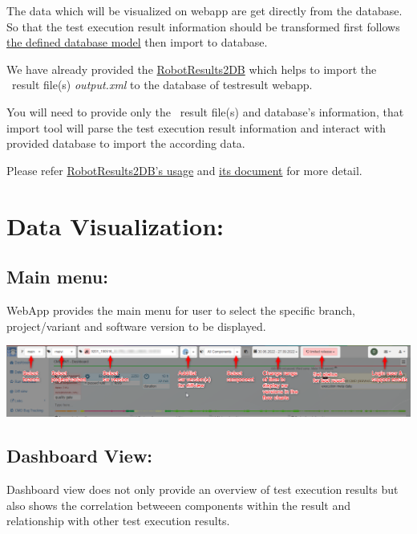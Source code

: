 The data which will be visualized on webapp are get directly from the database.
So that the test execution result information should be transformed first 
follows \href{https://github.com/test-fullautomation/testresultwebapp/blob/
develop/TestResultWebApp/mysql_server/datamodel/datamodel.svg}
{the defined database model} then import to database.

We have already provided the \href{https://github.com/test-fullautomation/
robotframework-testresultwebapptool}{RobotResults2DB} which helps to import the
\rfwcore\ result file(s) \emph{output.xml} to the database of testresult webapp.

You will need to provide only the \rfwcore\ result file(s) and database's 
information, that import tool will parse the test execution result information 
and interact with provided database to import the according data.

Please refer \href{https://github.com/test-fullautomation/
robotframework-testresultwebapptool#usage}{RobotResults2DB's usage} and 
\href{https://github.com/test-fullautomation/robotframework-
testresultwebapptool/blob/develop/RobotResults2DB/RobotResults2DB.pdf}
{its document} for more detail.


\hypertarget{data-visualization}{%
\section{Data Visualization:}\label{data-visualization}}

\hypertarget{main-menu}{%
\subsection{Main menu:}\label{main-menu}}
WebApp provides the main menu for user to select the specific branch, 
project/variant and software version to be displayed.

\includegraphics[width=1\linewidth]{./pictures/main-menu.png}

\hypertarget{dashboard-view}{%
\subsection{Dashboard View:}\label{dashboard-view}}
Dashboard view does not only provide an overview of test execution results but 
also shows the correlation betweeen components within the result 
and relationship with other test execution results.

